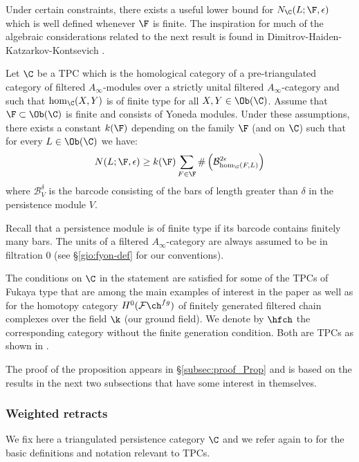 Under certain constraints, there exists a useful lower bound for
$N_{\C}(L;\F,\epsilon)$ which is well defined whenever $\F$ is
finite.  The inspiration for much of the algebraic considerations
related to the next result is found in
Dimitrov-Haiden-Katzarkov-Kontsevich \cite{DHKK:dyn_cat}.

\begin{prop} \label{prop:lower-bd}Let $\C$ be a TPC which is the homological category of a pre-triangulated category
  of filtered $A_{\infty}$-modules over a strictly unital filtered
  $A_{\infty}$-category and such that $\hom_{\C}(X,Y)$ is of finite
  type for all $X,Y\in \Ob(\C)$. Assume that $\F\subset \Ob (\C)$ is
  finite and consists of Yoneda modules. Under these assumptions,
  there exists a constant $k(\F)$ depending on the family $\F$ (and on
  $\C$) such that for every $L\in \Ob (\C)$ we have:
  $$N(L;\F,\epsilon)\geq k(\F) \sum_{F\in \F}\#
  \left( \mathcal{B}^{2\epsilon}_{\hom_{\C}(F,L)}\right)$$ where
  $\mathcal{B}^{\delta}_{V}$ is the barcode consisting of the bars of
  length greater than $\delta$ in the persistence module $V$.
\end{prop}
Recall that a persistence module is of finite type if its barcode
contains finitely many bars. The units of a filtered
$A_{\infty}$-category are always assumed to be in filtration $0$ (see
\S\ref{gio:fyon-def} for our conventions).

The conditions on $\C$ in the statement are satisfied for some of the
TPCs of Fukaya type that are among the main examples of interest in
the paper as well as for the homotopy category
$H^0(\mathcal{F}\ch^{fg})$ of finitely generated filtered
chain complexes over the field $\k$ (our ground field). We denote by
$\hfch$ the corresponding category without the finite generation
condition. Both are TPCs as shown in \cite{BCZ:tpc}.

The proof of the proposition appears in \S\ref{subsec:proof_Prop} and
is based on the results in the next two subsections that have
some interest in themselves.

\subsubsection{Weighted retracts}\label{subsec:retr} We fix here a
triangulated persistence category $\C$ and we refer again to
\cite{BCZ:tpc} for the basic definitions and notation relevant to
TPCs.

